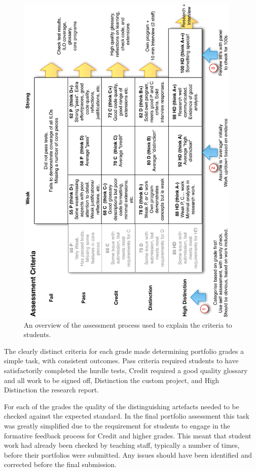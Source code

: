 \begin{figure}[htbp]
	\centering
	\includegraphics[width=0.98\textwidth]{AssessmentProcess}
	\caption{An overview of the assessment process used to explain the criteria to students.}
	\label{fig:assessment_process}
\end{figure}

The clearly distinct criteria for each grade made determining portfolio grades a simple task, with consistent outcomes. Pass criteria required students to have satisfactorily completed the hurdle tests, Credit required a good quality glossary and all work to be signed off, Distinction the custom project, and High Distinction the research report. 

For each of the grades the quality of the distinguishing artefacts needed to be checked against the expected standard. In the final portfolio assessment this task was greatly simplified due to the requirement for students to engage in the formative feedback process for Credit and higher grades. This meant that student work had already been checked by teaching staff, typically a number of times, before their portfolios were submitted. Any issues should have been identified and corrected before the final submission.

